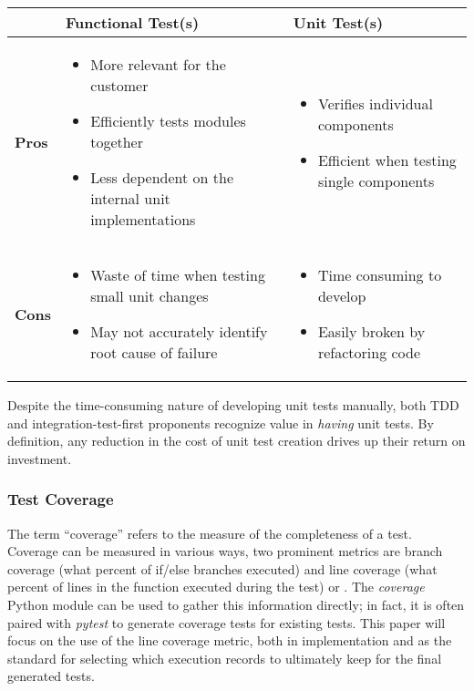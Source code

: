 \noindent\begin{tabular}{|>{\centering\arraybackslash}m{0.6cm}|>{\centering\arraybackslash}m{3.4cm}|>{\centering\arraybackslash}m{3.4cm}|}
    \hline
    \multirow{2}{*}{} & \textbf{Functional Test(s)} & \textbf{Unit Test(s)} \\
    \hline
    \textbf{Pros} & \begin{itemize}[leftmargin=*]
        \item More relevant for the customer
        \item Efficiently tests modules together
        \item Less dependent on the internal unit implementations
    \end{itemize} & \begin{itemize}[leftmargin=*]
        \item Verifies individual components
        \item Efficient when testing single components
    \end{itemize} \\
    \hline
    \textbf{Cons} & \begin{itemize}[leftmargin=*]
        \item Waste of time when testing small unit changes
        \item May not accurately identify root cause of failure
    \end{itemize} & \begin{itemize}[leftmargin=*]
        \item Time consuming to develop
        \item Easily broken by refactoring code
    \end{itemize} \\
    \hline
\end{tabular}
Despite the time-consuming nature of developing unit tests manually, both
TDD and integration-test-first proponents recognize value in \textit{having}
unit tests. By definition, any reduction in the cost of unit test creation drives 
up their return on investment.

\subsubsection{Test Coverage}\label{sec:intro-cov}
The term “coverage” refers to the measure of the completeness of a test.  
Coverage can be measured in various ways, two prominent metrics are branch coverage 
(what percent of if/else branches executed) and line coverage 
(what percent of lines in the function executed during the test) 
or \cite{wang2024software}. The \textit{coverage} Python module can
be used to gather this information directly; in fact, it is often paired with 
\textit{pytest} to generate coverage tests for existing tests. This paper will focus 
on the use of the line coverage metric, both in implementation and 
as the standard for selecting which execution records to ultimately 
keep for the final generated tests.


